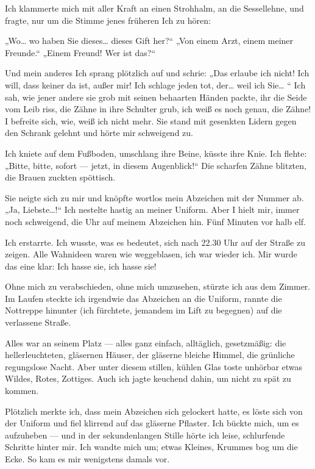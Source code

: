 Ich klammerte mich mit aller Kraft an einen Strohhalm, an die
Sessellehne, und fragte, nur um die Stimme jenes früheren Ich zu
hören:

„Wo\ldots{} wo haben Sie dieses\ldots{} dieses Gift her?“ „Von einem Arzt,
einem meiner Freunde.“ „Einem Freund! Wer ist das?“

Und mein anderes Ich sprang plötzlich auf und schrie: „Das erlaube
ich nicht! Ich will, dass keiner da ist, außer mir! Ich schlage
jeden tot, der\ldots{} weil ich Sie\ldots{} “ Ich sah, wie jener andere sie
grob mit seinen behaarten Händen packte, ihr die Seide vom Leib
riss, die Zähne in ihre Schulter grub, ich weiß es noch genau, die
Zähne! I befreite sich, wie, weiß ich nicht mehr. Sie stand mit
gesenkten Lidern gegen den Schrank gelehnt und hörte mir schweigend
zu.

Ich kniete auf dem Fußboden, umschlang ihre Beine, küsste ihre
Knie. Ich flehte: „Bitte, bitte, sofort — jetzt, in diesem
Augenblick!“ Die scharfen Zähne blitzten, die Brauen zuckten
spöttisch.

Sie neigte sich zu mir und knöpfte wortlos mein Abzeichen mit der
Nummer ab. „Ja, Liebste\ldots{}!“ Ich nestelte hastig an meiner Uniform.
Aber I hielt mir, immer noch schweigend, die Uhr auf meinem
Abzeichen hin. Fünf Minuten vor halb elf.

Ich erstarrte. Ich wusste, was es bedeutet, sich nach 22.30 Uhr auf
der Straße zu zeigen. Alle Wahnideen waren wie weggeblasen, ich war
wieder ich. Mir wurde das eine klar: Ich hasse sie, ich hasse sie!

Ohne mich zu verabschieden, ohne mich umzusehen, stürzte ich aus
dem Zimmer. Im Laufen steckte ich irgendwie das Abzeichen an die
Uniform, rannte die Nottreppe hinunter (ich fürchtete, jemandem im
Lift zu begegnen) auf die verlassene Straße.

Alles war an seinem Platz — alles ganz einfach, alltäglich,
gesetzmäßig: die hellerleuchteten, gläsernen Häuser, der gläserne
bleiche Himmel, die grünliche regungslose Nacht. Aber unter diesem
stillen, kühlen Glas toste unhörbar etwas Wildes, Rotes, Zottiges.
Auch ich jagte keuchend dahin, um nicht zu spät zu kommen.

Plötzlich merkte ich, dass mein Abzeichen sich gelockert hatte, es
löste sich von der Uniform und fiel klirrend auf das gläserne
Pflaster. Ich bückte mich, um es aufzuheben — und in der
sekundenlangen Stille hörte ich leise, schlurfende Schritte hinter
mir. Ich wandte mich um; etwas Kleines, Krummes bog um die Ecke. So
kam es mir wenigstens damals vor.

